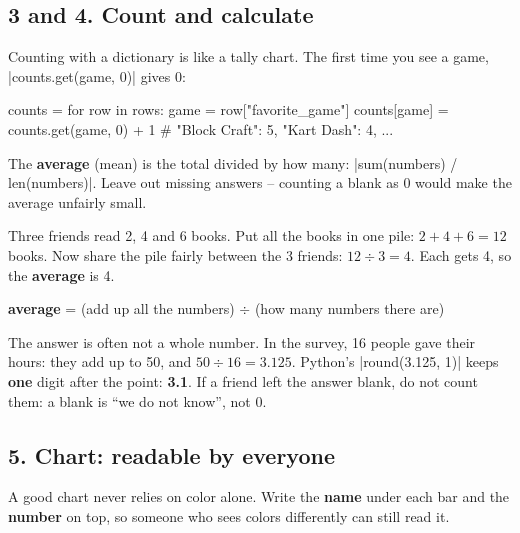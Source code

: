 \subsection{3 and 4. Count and calculate}
Counting with a dictionary is like a tally chart. The first time you see a game, \py|counts.get(game, 0)| gives 0:
\begin{pycode}
counts = {}
for row in rows:
    game = row["favorite_game"]
    counts[game] = counts.get(game, 0) + 1
# {"Block Craft": 5, "Kart Dash": 4, ...}
\end{pycode}
The \textbf{average} (mean) is the total divided by how many: \py|sum(numbers) / len(numbers)|. Leave out missing answers -- counting a blank as 0 would make the average unfairly small.

\begin{tip}
Three friends read 2, 4 and 6 books. Put all the books in one pile: $2 + 4 + 6 = 12$ books. Now share the pile fairly between the 3 friends: $12 \div 3 = 4$. Each gets 4, so the \textbf{average} is 4.
\begin{center}
\textbf{average} = (add up all the numbers) $\div$ (how many numbers there are)
\end{center}
The answer is often not a whole number. In the survey, 16 people gave their hours: they add up to 50, and $50 \div 16 = 3.125$. Python's \py|round(3.125, 1)| keeps \textbf{one} digit after the point: \textbf{3.1}. If a friend left the answer blank, do not count them: a blank is \enquote{we do not know}, not 0.
\end{tip}

\subsection{5. Chart: readable by everyone}
A good chart never relies on color alone. Write the \textbf{name} under each bar and the \textbf{number} on top, so someone who sees colors differently can still read it.


